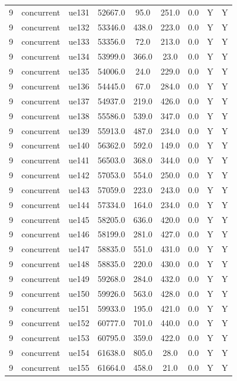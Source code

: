 \begin{table}[ht]
\begin{tabular}{|c|c|c|c|c|c|c|c|c|}
9 & concurrent & ue131 & 52667.0 & 95.0 & 251.0 & 0.0 & Y & Y \\
9 & concurrent & ue132 & 53346.0 & 438.0 & 223.0 & 0.0 & Y & Y \\
9 & concurrent & ue133 & 53356.0 & 72.0 & 213.0 & 0.0 & Y & Y \\
9 & concurrent & ue134 & 53999.0 & 366.0 & 23.0 & 0.0 & Y & Y \\
9 & concurrent & ue135 & 54006.0 & 24.0 & 229.0 & 0.0 & Y & Y \\
9 & concurrent & ue136 & 54445.0 & 67.0 & 284.0 & 0.0 & Y & Y \\
9 & concurrent & ue137 & 54937.0 & 219.0 & 426.0 & 0.0 & Y & Y \\
9 & concurrent & ue138 & 55586.0 & 539.0 & 347.0 & 0.0 & Y & Y \\
9 & concurrent & ue139 & 55913.0 & 487.0 & 234.0 & 0.0 & Y & Y \\
9 & concurrent & ue140 & 56362.0 & 592.0 & 149.0 & 0.0 & Y & Y \\
9 & concurrent & ue141 & 56503.0 & 368.0 & 344.0 & 0.0 & Y & Y \\
9 & concurrent & ue142 & 57053.0 & 554.0 & 250.0 & 0.0 & Y & Y \\
9 & concurrent & ue143 & 57059.0 & 223.0 & 243.0 & 0.0 & Y & Y \\
9 & concurrent & ue144 & 57334.0 & 164.0 & 234.0 & 0.0 & Y & Y \\
9 & concurrent & ue145 & 58205.0 & 636.0 & 420.0 & 0.0 & Y & Y \\
9 & concurrent & ue146 & 58199.0 & 281.0 & 427.0 & 0.0 & Y & Y \\
9 & concurrent & ue147 & 58835.0 & 551.0 & 431.0 & 0.0 & Y & Y \\
9 & concurrent & ue148 & 58835.0 & 220.0 & 430.0 & 0.0 & Y & Y \\
9 & concurrent & ue149 & 59268.0 & 284.0 & 432.0 & 0.0 & Y & Y \\
9 & concurrent & ue150 & 59926.0 & 563.0 & 428.0 & 0.0 & Y & Y \\
9 & concurrent & ue151 & 59933.0 & 195.0 & 421.0 & 0.0 & Y & Y \\
9 & concurrent & ue152 & 60777.0 & 701.0 & 440.0 & 0.0 & Y & Y \\
9 & concurrent & ue153 & 60795.0 & 359.0 & 422.0 & 0.0 & Y & Y \\
9 & concurrent & ue154 & 61638.0 & 805.0 & 28.0 & 0.0 & Y & Y \\
9 & concurrent & ue155 & 61664.0 & 458.0 & 21.0 & 0.0 & Y & Y \\

\end{tabular}
\end{table}
